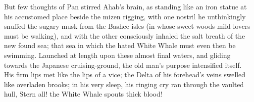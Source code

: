 \documentclass{article}
\begin{document}
   But few thoughts of Pan stirred Ahab's brain, as standing like an iron statue at his accustomed place beside the mizen
rigging, with one nostril he unthinkingly snuffed the sugary musk from the Bashee isles (in whose sweet woods mild lovers must be walking), and with the other consciously inhaled the salt breath of the new found sea; that sea in which the hated White Whale must even then be swimming. Launched at length upon these almost final waters, and gliding towards the Japanese cruising-ground, the old man's purpose intensified itself. His firm lips met like the lips of a vice; the Delta of his forehead's veins swelled like overladen brooks; in his very sleep, his ringing cry ran through the vaulted hull, Stern all! the White Whale spouts thick blood! 
\end{document}
